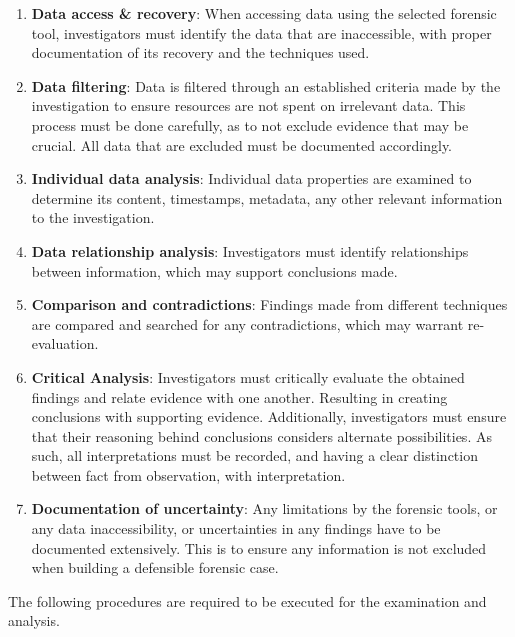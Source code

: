 \documentclass[a4paper]{report}
\begin{document}
\begin{justify}
\begin{enumerate}
    \item \textbf{Data access \& recovery}: When accessing data using the selected forensic tool, investigators must identify the data that are inaccessible, with proper documentation of its recovery and the techniques used.
    \item \textbf{Data filtering}: Data is filtered through an established criteria made by the investigation to ensure resources are not spent on irrelevant data. This process must be done carefully, as to not exclude evidence that may be crucial. All data that are excluded must be documented accordingly. 
    \item \textbf{Individual data analysis}: Individual data properties are examined to determine its content, timestamps, metadata, any other relevant information to the investigation. 
    \item \textbf{Data relationship analysis}: Investigators must identify relationships between information, which may support conclusions made. 
    \item \textbf{Comparison and contradictions}: Findings made from different techniques are compared and searched for any contradictions, which may warrant re-evaluation. 
    \item \textbf{Critical Analysis}: Investigators must critically evaluate the obtained findings and relate evidence with one another. Resulting in creating conclusions with supporting evidence. Additionally, investigators must ensure that their reasoning behind conclusions considers alternate possibilities. As such, all interpretations must be recorded, and having a clear distinction between fact from observation, with interpretation.
    \item \textbf{Documentation of uncertainty}: Any limitations by the forensic tools, or any data inaccessibility, or uncertainties in any findings have to be documented extensively. This is to ensure any information is not excluded when building a defensible forensic case. 
\end{enumerate}

The following procedures are required to be executed for the examination and analysis. 


\end{justify}
\end{document}
